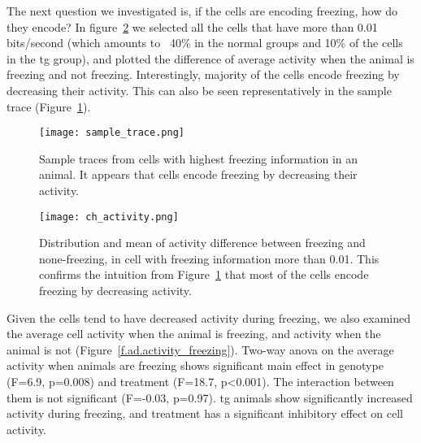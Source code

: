 The next question we investigated is, if the cells are encoding freezing, how do they encode? In figure~\ref{f.ad.ch_activity} we selected all the cells that have more than 0.01 bits/second (which amounts to ~40\% in the normal groups and 10\% of the cells in the \gls{tg} group), and plotted the difference of average activity when the animal is freezing and not freezing. Interestingly, majority of the cells encode freezing by decreasing their activity. This can also be seen representatively in the sample trace (Figure~\ref{f.ad.sample_trace}).
\begin{figure}[h]
    \texttt{[image: sample\_trace.png]}
    \caption{Sample traces from cells with highest freezing information in an animal. It appears that cells encode freezing by decreasing their activity. \label{f.ad.sample_trace}}
\end{figure}
\begin{figure}[h]
    \texttt{[image: ch\_activity.png]}
    \caption{Distribution and mean of activity difference between freezing and none-freezing, in cell with freezing information more than 0.01. This confirms the intuition from Figure~\ref{f.ad.sample_trace} that most of the cells encode freezing by decreasing activity. \label{f.ad.ch_activity}}
\end{figure}

Given the cells tend to have decreased activity during freezing, we also examined the average cell activity when the animal is freezing, and activity when the animal is not (Figure~\ref{f.ad.activity_freezing}). Two-way \gls{anova} on the average activity when animals are freezing shows significant main effect in genotype (F=6.9, p=0.008) and treatment (F=18.7, p<0.001). The interaction between them is not significant (F=-0.03, p=0.97). \Gls{tg} animals show significantly increased activity during freezing, and \tglu treatment has a significant inhibitory effect on cell activity. 

